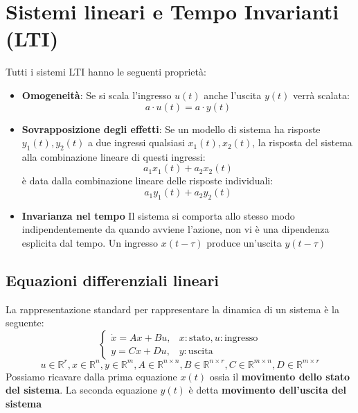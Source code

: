 \documentclass[a4paper,12pt]{article}
\begin{document}
	\section{Sistemi lineari e Tempo Invarianti (LTI)}
	Tutti i sistemi LTI hanno le seguenti proprietà:
	\begin{itemize}
		\item \textbf{Omogeneità}: Se si scala l'ingresso $u(t)$ anche l'uscita $y(t)$ verrà scalata:
		\begin{equation*}
			a \cdot u(t) = a \cdot y(t)
		\end{equation*}
		\item \textbf{Sovrapposizione degli effetti}: Se un modello di sistema ha risposte $y_1(t), y_2(t)$ a due ingressi qualsiasi $x_1(t), x_2(t)$, la risposta del sistema alla combinazione lineare di questi ingressi:
		\begin{equation*}
			a_1x_1(t) + a_2x_2(t)
		\end{equation*}
		è data dalla combinazione lineare delle risposte individuali:
		\begin{equation*}
			a_1y_1(t) + a_2y_2(t)
		\end{equation*}
		\item \textbf{Invarianza nel tempo}
		Il sistema si comporta allo stesso modo indipendentemente da quando avviene l'azione, non vi è una dipendenza esplicita dal tempo. Un ingresso $x(t - \tau)$ produce un'uscita $y(t - \tau)$
	\end{itemize}
	\subsection{Equazioni differenziali lineari}
	La rappresentazione standard per rappresentare la dinamica di un sistema è la seguente:
	\begin{equation}
		\begin{cases}
			\dot{x} = Ax + Bu, &x: \text{stato}, u: \text{ingresso}\\
			y = Cx + Du, &y: \text{uscita}
		\end{cases}
	\end{equation}
	\begin{equation*}
		u \in \mathbb{R}^r, x \in \mathbb{R}^n, y \in \mathbb{R}^m, A \in \mathbb{R}^{n \times n}, B \in \mathbb{R}^{n \times r}, C \in \mathbb{R}^{m \times n}, D \in \mathbb{R}^{m \times r}
	\end{equation*}
	Possiamo ricavare dalla prima equazione $x(t)$ ossia il \textbf{movimento dello stato del sistema}. La seconda equazione $y(t)$ è detta \textbf{movimento dell'uscita del sistema}
\end{document}
